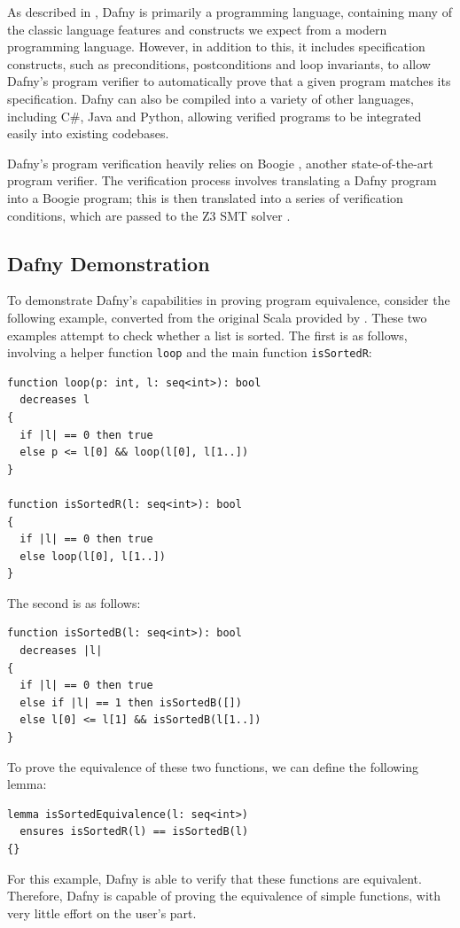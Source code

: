 \documentclass[a4paper, 11pt]{article}
\begin{document}
As described in \textcite{leinoDafnyAutomaticProgram2010}, Dafny is primarily a programming language, containing many of the classic language features and constructs we expect from a modern programming language. However, in addition to this, it includes specification constructs, such as preconditions, postconditions and loop invariants, to allow Dafny's program verifier to automatically prove that a given program matches its specification. Dafny can also be compiled into a variety of other languages, including C\#, Java and Python, allowing verified programs to be integrated easily into existing codebases.

Dafny's program verification heavily relies on Boogie \parencite{10.1007/11804192_17}, another state-of-the-art program verifier. The verification process involves translating a Dafny program into a Boogie program; this is then translated into a series of verification conditions, which are passed to the Z3 SMT solver \parencite{10.1007/978-3-540-78800-3_24}. 

\subsection{Dafny Demonstration}

To demonstrate Dafny's capabilities in proving program equivalence, consider the following example, converted from the original Scala provided by \textcite{milovancevicProvingDisprovingEquivalence2023}. These two examples attempt to check whether a list is sorted. The first is as follows, involving a helper function \lstinline|loop| and the main function \lstinline|isSortedR|:

\begin{lstlisting}[caption=\lstinline|isSortedR| function with \lstinline|loop| helper function, label=lst:isSortedR]
function loop(p: int, l: seq<int>): bool
  decreases l
{
  if |l| == 0 then true
  else p <= l[0] && loop(l[0], l[1..])
}

function isSortedR(l: seq<int>): bool
{
  if |l| == 0 then true
  else loop(l[0], l[1..])
}
\end{lstlisting}
%
The second is as follows:
\begin{lstlisting}[caption=\lstinline|isSortedB| Function, label=lst:isSortedB]
function isSortedB(l: seq<int>): bool
  decreases |l|
{
  if |l| == 0 then true
  else if |l| == 1 then isSortedB([])
  else l[0] <= l[1] && isSortedB(l[1..])
}
\end{lstlisting}
%
To prove the equivalence of these two functions, we can define the following lemma:
\begin{lstlisting}[caption=Equivalence Lemma for \lstinline|isSortedR| and \lstinline|isSortedB|]
lemma isSortedEquivalence(l: seq<int>)
  ensures isSortedR(l) == isSortedB(l)
{}
\end{lstlisting}
%
For this example, Dafny is able to verify that these functions are equivalent. Therefore, Dafny is capable of proving the equivalence of simple functions, with very little effort on the user's part.
\end{document}
